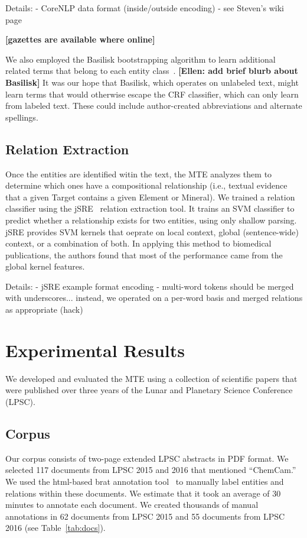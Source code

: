 \documentclass[letterpaper]{article} %
\begin{document}
Details:
- CoreNLP data format (inside/outside encoding) - see Steven's wiki
page

{\bf [gazettes are available where online]}

We also employed the Basilisk bootstrapping algorithm to learn
additional related terms that belong to each entity
class~\cite{thelen:basilisk02}.  {\bf [Ellen: add brief blurb about
Basilisk]}  It was our hope that Basilisk, which operates on unlabeled
text, might learn terms that would otherwise escape the CRF
classifier, which can only learn from labeled text.  These could
include author-created abbreviations and alternate spellings.

\subsection{Relation Extraction}

Once the entities are identified witin the text, the MTE analyzes them
to determine which ones have a compositional relationship (i.e.,
textual evidence that a given Target contains a given Element or
Mineral).  
%
We trained a relation classifier using the jSRE~\cite{giuliano:jsre06}
relation extraction tool.  It trains an SVM classifier to predict
whether a relationship exists for two entities, using only shallow
parsing.  jSRE provides SVM kernels that oeprate on local context,
global (sentence-wide) context, or a combination of both.  In applying
this method to biomedical publications, the authors found that most of
the performance came from the global kernel features.

Details:
- jSRE example format encoding
- multi-word tokens should be merged with underscores... instead, we
operated on a per-word basis and merged relations as appropriate (hack)

\section{Experimental Results}

We developed and evaluated the MTE using a collection of scientific
papers that were published over three years of the Lunar and Planetary
Science Conference (LPSC).

\subsection{Corpus}

Our corpus consists of two-page extended LPSC abstracts in PDF format.
We selected 117 documents from LPSC 2015 and 2016 that mentioned
``ChemCam.''  We used the html-based brat annotation tool~\cite{brat}
to manually label entities and relations within these documents.  We
estimate that it took an average of 30 minutes to annotate each
document.  We created thousands of manual annotations in 62 documents
from LPSC 2015 and 55 documents from LPSC 2016 (see
Table~\ref{tab:docs}).
\end{document}
